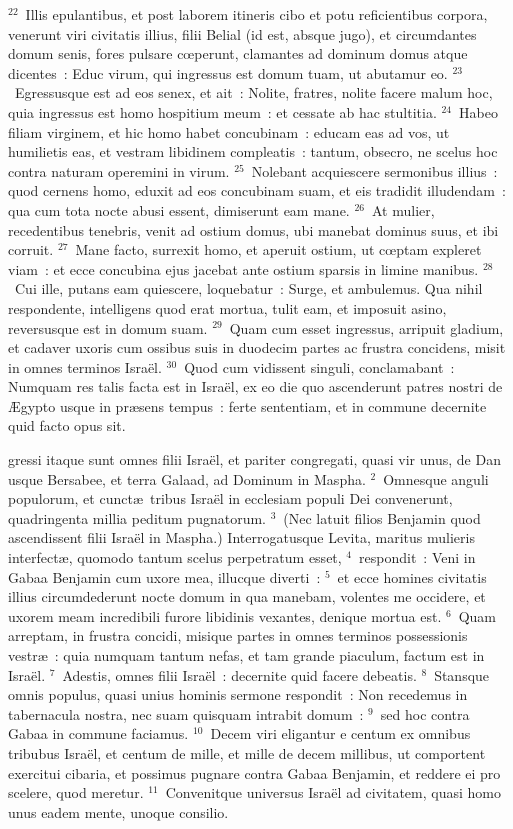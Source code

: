 ${}^{22}$~Illis epulantibus, et post laborem itineris cibo et potu reficientibus corpora, venerunt viri civitatis illius, filii Belial (id est, absque jugo), et circumdantes domum senis, fores pulsare cœperunt, clamantes ad dominum domus atque dicentes~: Educ virum, qui ingressus est domum tuam, ut abutamur eo.
${}^{23}$~Egressusque est ad eos senex, et ait~: Nolite, fratres, nolite facere malum hoc, quia ingressus est homo hospitium meum~: et cessate ab hac stultitia.
${}^{24}$~Habeo filiam virginem, et hic homo habet concubinam~: educam eas ad vos, ut humilietis eas, et vestram libidinem compleatis~: tantum, obsecro, ne scelus hoc contra naturam operemini in virum.
${}^{25}$~Nolebant acquiescere sermonibus illius~: quod cernens homo, eduxit ad eos concubinam suam, et eis tradidit illudendam~: qua cum tota nocte abusi essent, dimiserunt eam mane.
${}^{26}$~At mulier, recedentibus tenebris, venit ad ostium domus, ubi manebat dominus suus, et ibi corruit.
${}^{27}$~Mane facto, surrexit homo, et aperuit ostium, ut cœptam expleret viam~: et ecce concubina ejus jacebat ante ostium sparsis in limine manibus.
${}^{28}$~Cui ille, putans eam quiescere, loquebatur~: Surge, et ambulemus. Qua nihil respondente, intelligens quod erat mortua, tulit eam, et imposuit asino, reversusque est in domum suam.
${}^{29}$~Quam cum esset ingressus, arripuit gladium, et cadaver uxoris cum ossibus suis in duodecim partes ac frustra concidens, misit in omnes terminos Isra\"el.
${}^{30}$~Quod cum vidissent singuli, conclamabant~: Numquam res talis facta est in Isra\"el, ex eo die quo ascenderunt patres nostri de \AE gypto usque in pr\ae sens tempus~: ferte sententiam, et in commune decernite quid facto opus sit.

\bchapter
{}gressi itaque sunt omnes filii Isra\"el, et pariter congregati, quasi vir unus, de Dan usque Bersabee, et terra Galaad, ad Dominum in Maspha.
${}^{2}$~Omnesque anguli populorum, et cunct\ae\ tribus Isra\"el in ecclesiam populi Dei convenerunt, quadringenta millia peditum pugnatorum.
${}^{3}$~(Nec latuit filios Benjamin quod ascendissent filii Isra\"el in Maspha.) Interrogatusque Levita, maritus mulieris interfect\ae , quomodo tantum scelus perpetratum esset,
${}^{4}$~respondit~: Veni in Gabaa Benjamin cum uxore mea, illucque diverti~:
${}^{5}$~et ecce homines civitatis illius circumdederunt nocte domum in qua manebam, volentes me occidere, et uxorem meam incredibili furore libidinis vexantes, denique mortua est.
${}^{6}$~Quam arreptam, in frustra concidi, misique partes in omnes terminos possessionis vestr\ae~: quia numquam tantum nefas, et tam grande piaculum, factum est in Isra\"el.
${}^{7}$~Adestis, omnes filii Isra\"el~: decernite quid facere debeatis.
${}^{8}$~Stansque omnis populus, quasi unius hominis sermone respondit~: Non recedemus in tabernacula nostra, nec suam quisquam intrabit domum~:
${}^{9}$~sed hoc contra Gabaa in commune faciamus.
${}^{10}$~Decem viri eligantur e centum ex omnibus tribubus Isra\"el, et centum de mille, et mille de decem millibus, ut comportent exercitui cibaria, et possimus pugnare contra Gabaa Benjamin, et reddere ei pro scelere, quod meretur.
${}^{11}$~Convenitque universus Isra\"el ad civitatem, quasi homo unus eadem mente, unoque consilio.


